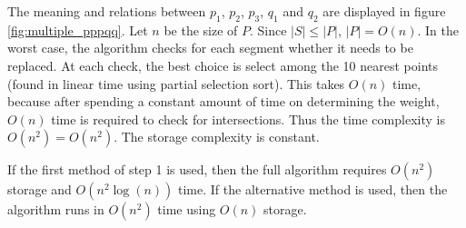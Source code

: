 \documentclass[11pt]{article}
\begin{document}
The meaning and relations between $p_1$, $p_2$, $p_3$, $q_1$ and $q_2$ are displayed in figure \ref{fig:multiple_pppqq}.
Let $n$ be the size of $P$. Since $|S| \leq |P|$, $|P| = O(n)$.
In the worst case, the algorithm checks for each segment whether it needs to be replaced. At each check, the best choice is select among the 10 nearest points (found in linear time using partial selection sort). This takes $O(n)$ time, because after spending a constant amount of time on determining the weight, $O(n)$ time is required to check for intersections. Thus the time complexity is $O(n^2) = O(n^2)$. The storage complexity is constant.

If the first method of step 1 is used, then the full algorithm requires $O(n^2)$ storage and $O(n^2\log(n))$ time. If the alternative method is used, then the algorithm runs in $O(n^2)$ time using $O(n)$ storage.
\end{document}
